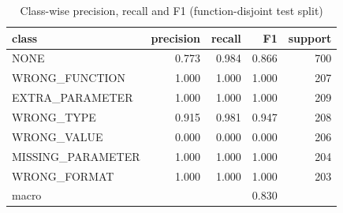 \begin{table}[t]
\centering
\caption{Class-wise precision, recall and F1 (function-disjoint test split)}
\label{tab:classwise_function_disjoint}
\begin{tabular}{lrrrr}
\hline
class & precision & recall & F1 & support \\
\hline
NONE & 0.773 & 0.984 & 0.866 & 700 \\
WRONG\_FUNCTION & 1.000 & 1.000 & 1.000 & 207 \\
EXTRA\_PARAMETER & 1.000 & 1.000 & 1.000 & 209 \\
WRONG\_TYPE & 0.915 & 0.981 & 0.947 & 208 \\
WRONG\_VALUE & 0.000 & 0.000 & 0.000 & 206 \\
MISSING\_PARAMETER & 1.000 & 1.000 & 1.000 & 204 \\
WRONG\_FORMAT & 1.000 & 1.000 & 1.000 & 203 \\
macro &  &  & 0.830 &  \\
\hline
\end{tabular}
\end{table}
